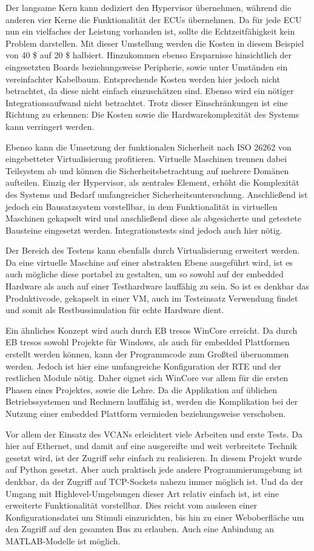 \documentclass[
  a4paper,					    %
  twoside,
  DIV=calc,     				%
  bibliography=totoc,
  cleardoublepage=empty,
  ngerman,     					%
  final       					%
]{scrbook}
\begin{document}
Der langsame Kern kann dediziert den Hypervisor übernehmen, während die anderen vier Kerne die Funktionalität der ECUs übernehmen. Da für jede ECU nun ein vielfaches der Leistung vorhanden ist, sollte die Echtzeitfähigkeit kein Problem darstellen. Mit dieser Umstellung werden die Kosten in diesem Beispiel von 40 \$ auf 20 \$ halbiert. Hinzukommen ebenso Ersparnisse hinsichtlich der eingesetzten Boards beziehungsweise Peripherie, sowie unter Umständen ein vereinfachter Kabelbaum. Entsprechende Kosten werden hier jedoch nicht betrachtet, da diese nicht einfach einzuschätzen sind. Ebenso wird ein nötiger Integrationsaufwand nicht betrachtet. Trotz dieser Einschränkungen ist eine Richtung zu erkennen: Die Kosten sowie die Hardwarekomplexität des Systems kann verringert werden.

Ebenso kann die Umsetzung der funktionalen Sicherheit nach ISO 26262 von eingebetteter Virtualisierung profitieren. Virtuelle Maschinen trennen dabei Teilsystem ab und können die Sicherheitsbetrachtung auf mehrere Domänen aufteilen. Einzig der Hypervisor, als zentrales Element, erhöht die Komplexität des Systems und Bedarf umfangreicher Sicherheitsuntersuchung. Anschließend ist jedoch ein Bausatzsystem vorstellbar, in dem Funktionalität in virtuellen Maschinen gekapselt wird und anschließend diese als abgesicherte und getestete Bausteine eingesetzt werden. Integrationstests sind jedoch auch hier nötig.

Der Bereich des Testens kann ebenfalls durch Virtualisierung erweitert werden. Da eine virtuelle Maschine auf einer abstrakten Ebene ausgeführt wird, ist es auch mögliche diese portabel zu gestalten, um so sowohl auf der embedded Hardware als auch auf einer Testhardware lauffähig zu sein. So ist es denkbar das Produktivcode, gekapselt in einer VM, auch im Testeinsatz Verwendung findet und somit als Restbussimulation für echte Hardware dient.

Ein ähnliches Konzept wird auch durch EB tresos WinCore erreicht. Da durch EB tresos sowohl Projekte für Windows, als auch für embedded Plattformen erstellt werden können, kann der Programmcode zum Großteil übernommen werden. Jedoch ist hier eine umfangreiche Konfiguration der RTE und der restlichen Module nötig. Daher eignet sich WinCore vor allem für die ersten Phasen eines Projektes, sowie die Lehre. Da die Applikation auf üblichen Betriebssystemen und Rechnern lauffähig ist, werden die Komplikation bei der Nutzung einer embedded Plattform vermieden beziehungsweise verschoben.

Vor allem der Einsatz des VCANs erleichtert viele Arbeiten und erste Tests. Da hier auf Ethernet, und damit auf eine ausgereifte und weit verbreitete Technik gesetzt wird, ist der Zugriff sehr einfach zu realisieren. In diesem Projekt wurde auf Python gesetzt. Aber auch praktisch jede andere Programmierumgebung ist denkbar, da der Zugriff auf TCP-Sockets nahezu immer möglich ist. Und da der Umgang mit Highlevel-Umgebungen dieser Art relativ einfach ist, ist eine erweiterte Funktionalität vorstellbar. Dies reicht vom auslesen einer Konfigurationsdatei um Stimuli einzurichten, bis hin zu einer Weboberfläche um den Zugriff auf den gesamten Bus zu erlauben. Auch eine Anbindung an MATLAB-Modelle ist möglich.
\end{document}
